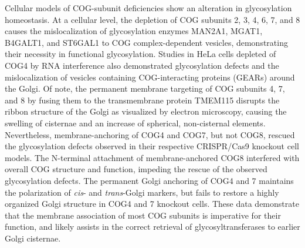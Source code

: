 Cellular models of COG-subunit deficiencies show an alteration in glycosylation homeostasis\cite{miller_recognition_2012}. At a cellular level, the depletion of COG subunits 2, 3, 4, 6, 7, and 8 causes the mislocalization of glycosylation enzymes MAN2A1, MGAT1, B4GALT1, and ST6GAL1 to COG complex-dependent vesicles\cite{shestakova_cog_2006,pokrovskaya_conserved_2011}, demonstrating their necessity in functional glycosylation\cite{reynders_how_2011}. Studies in HeLa cells depleted of COG4 by RNA interference also demonstrated glycosylation defects and the mislocalization of vesicles containing COG-interacting proteins (GEARs) around the Golgi\cite{oka_cog_2004,blackburn_maintaining_2019,pokrovskaya_conserved_2011}. Of note, the permanent membrane targeting of COG subunits 4, 7, and 8 by fusing them to the transmembrane protein TMEM115\cite{ong_tmem115_2014} disrupts the ribbon structure of the Golgi as visualized by electron microscopy, causing the swelling of cisternae and an increase of spherical, non-cisternal elements\cite{climer_membrane_2018}. Nevertheless, membrane-anchoring of COG4 and COG7, but not COG8, rescued the glycosylation defects observed in their respective CRISPR/Cas9 knockout cell models. The N-terminal attachment of membrane-anchored COG8 interfered with overall COG structure and function, impeding the rescue of the observed glycosylation defects\cite{climer_membrane_2018}. The permanent Golgi anchoring of COG4 and 7 maintains the polarization of \emph{cis}- and \emph{trans}-Golgi markers, but fails to restore a highly organized Golgi structure in COG4 and 7 knockout cells. These data demonstrate that the membrane association of most COG subunits is imperative for their function, and likely assists in the correct retrieval of glycosyltransferases to earlier Golgi cisternae.

